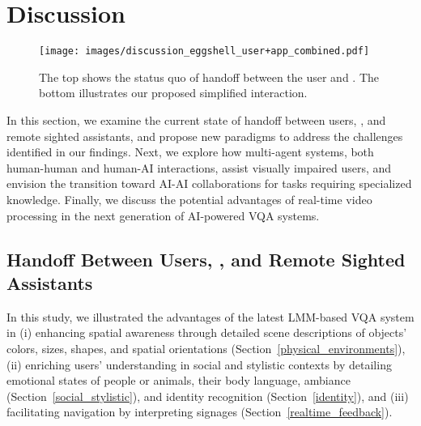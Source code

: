 \section{Discussion}
\label{sec:discussion}


\begin{figure*}[t!]
\centering
\texttt{[image: images/discussion\_eggshell\_user+app\_combined.pdf]}
\caption{The top shows the status quo of handoff between the user and \bma. The bottom illustrates our proposed simplified interaction.}
\label{fig.discussion_eggshell_user+app}
\end{figure*}




In this section, we examine the current state of handoff between users, \bma, and remote sighted assistants, and propose new paradigms to address the challenges identified in our findings. 
Next, we explore how multi-agent systems, both human-human and human-AI interactions, assist visually impaired users, and envision the transition toward AI-AI collaborations for tasks requiring specialized knowledge. Finally, we discuss the potential advantages of real-time video processing in the next generation of AI-powered VQA systems.






\subsection{Handoff Between Users, \bma, and Remote Sighted Assistants}
\label{handoff}

In this study, we illustrated the advantages of the latest LMM-based VQA system in (i) enhancing spatial awareness through detailed scene descriptions of objects' colors, sizes, shapes, and spatial orientations
(Section~\ref{physical_environments}), (ii) enriching users' understanding in social and stylistic contexts by detailing emotional states of people or animals, their body language, ambiance
(Section~\ref{social_stylistic}), and identity recognition (Section~\ref{identity}), 
and (iii) facilitating navigation by interpreting signages (Section~\ref{realtime_feedback}). 


